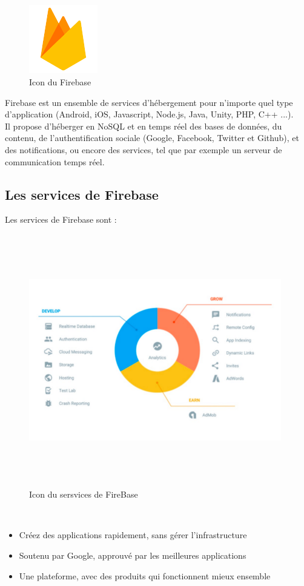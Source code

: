 \begin{figure}[H]
  \centering
 \includegraphics[width=3cm,height=3cm,keepaspectratio]{figure/fig2.png}
  \caption{Icon du Firebase }
\end{figure}

Firebase est un ensemble de services d'hébergement pour n'importe quel type d'application (Android, iOS, Javascript, Node.js, Java, Unity, PHP, C++ ...).\\ Il propose d'héberger en NoSQL et en temps réel des bases de données, du contenu, de l'authentification sociale (Google, Facebook, Twitter et Github), et des notifications, ou encore des services, tel que par exemple un serveur de communication temps réel.
\newpage
\subsection{Les services de Firebase}
Les services de Firebase sont : \\
\begin{figure}[H]
  \centering
 \includegraphics[width=11cm,height=11cm,keepaspectratio]{figure/fig3.png}
  \caption{Icon du sersvices de FireBase }
\end{figure}
\\
\begin{itemize}
\item Créez des applications rapidement, sans gérer l'infrastructure\\
\item Soutenu par Google, approuvé par les meilleures applications\\
\item Une plateforme, avec des produits qui fonctionnent mieux ensemble\\

\end{itemize}

